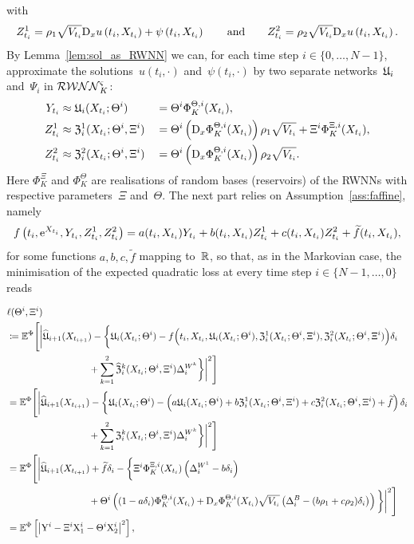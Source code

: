 with
$$
Z^1_{t_i}  = \rho_1 \sqrt{V_{t_{i}}} \mathrm{D}_{x} u\left({t_{i}}, X_{t_{i}}\right) + \psi\left({t_{i}}, X_{t_{i}}\right)
\qquad\text{and}\qquad
Z^2_{t_i}  = \rho_2\sqrt{V_{t_{i}}} \mathrm{D}_{x} u\left({t_{i}}, X_{t_{i}}\right).
$$
By Lemma~\ref{lem:sol_as_RWNN} we can, for each time step $i\in\{0, \dots, N-1\}$, approximate the solutions~$u(t_i,\cdot)$ and~$\psi(t_i,\cdot)$ by two separate networks~$\mathfrak{U}_i$ and~$\Psi_i$ in $\mathcal{RWNN}_K^{\varsigma}$: 
\begin{alignat*}{3}
    Y_{t_i} &\approx \mathfrak{U}_i(X_{t_i}; \Theta^i) && = \Theta^i \Phi^{\Theta,i}_K(X_{t_i}), \\
    Z^1_{t_i} &\approx \mathfrak{Z}^1_i(X_{t_i}; \Theta^i, \Xi^i) && = \Theta^i \left(\mathrm{D}_{x} \Phi_K^{\Theta,i}(X_{t_i})\right) \rho_1\sqrt{V_{t_i}} + \Xi^i\Phi^{\Xi,i}_K(X_{t_i}), \\
    Z^2_{t_i} &\approx \mathfrak{Z}^2_i(X_{t_i}; \Theta^i, \Xi^i) && = \Theta^i \left(\mathrm{D}_{x} \Phi_K^{\Theta,i}(X_{t_i})\right) \rho_2\sqrt{V_{t_i}}.
\end{alignat*}
Here $\Phi_K^\Xi$ and $\Phi_K^\Theta$ are realisations of random bases (reservoirs) of the RWNNs with respective parameters~$\Xi$ and~$\Theta$. 
The next part relies on Assumption~\ref{ass:faffine}, namely
$$
f\left(t_i, \mathrm{e}^{X_{t_{i}}},  Y_{t_i},  Z^1_{t_i},  Z^2_{t_i}\right) = a(t_i,X_{t_i}) Y_{t_i} + b(t_i,X_{t_i}) Z^1_{t_i} + c(t_i,X_{t_i}) Z^2_{t_i} + \widetilde{f}(t_i,X_{t_i}),
$$
for some functions $a,b,c,\widetilde{f}$ mapping to~$\mathbb{R}$, so that, as in the Markovian case, the minimisation of the expected quadratic loss at every time step $i\in\{N-1,\dots,0\}$ reads
\begin{small}
\begin{align*}
    &\ell(\Theta^i, \Xi^i) \\ &\defEqual \EE^\Phi\Bigg[\bigg|\widehat\Uf_{i+1}(X_{t_{i+1}})-\bigg\{\Uf_i(X_{t_i}; \Theta^i)-f\Big(t_{i}, X_{t_{i}}, \Uf_i(X_{t_i}; \Theta^i), \Zf^1_i(X_{t_i}; \Theta^i, \Xi^i), \Zf^2_i(X_{t_i}; \Theta^i, \Xi^i)\Big)\Deli \\
    & \hspace{3cm} + \sum_{k=1}^2\widehat \Zf^k_i(X_{t_i}; \Theta^i, \Xi^i)\Delta^{W^k}_{i}\bigg\}\bigg|^2\Bigg] \\
    &= \EE^\Phi\Bigg[\bigg|\widehat\Uf_{i+1}(X_{t_{i+1}})-\bigg\{\Uf_i(X_{t_i}; \Theta^i)-\left(a\Uf_i(X_{t_i}; \Theta^i) + b\Zf^1_i(X_{t_i}; \Theta^i, \Xi^i) + c\Zf^2_i(X_{t_i}; \Theta^i, \Xi^i) + \widetilde{f}\right)\Deli \\
    & \hspace{3cm} + \sum_{k=1}^2\Zf^k_i(X_{t_i}; \Theta^i, \Xi^i)\Delta^{W^k}_{i}\bigg\}\bigg|^2\Bigg] \\
    &= \EE^\Phi\Bigg[\bigg|\widehat\Uf_{i+1}(X_{t_{i+1}}) + \widetilde{f}\Deli  - \bigg\{ \Xi^i\Phi_K^{\Xi,i}(X_{t_i})\left(\Delta^{W^1}_{i}-b\Deli \right) \\
    & \hspace{3cm} + \Theta^i\left((1-a\Deli )\Phi_K^{\Theta,i}(X_{t_i}) + \Dx\Phi_K^{\Theta,i}(X_{t_i})\sqrt{V_{t_i}}\left(\Delta^{B}_{i} - (b\rho_1 + c\rho_2)\Deli \right) \right) \bigg\}\bigg|^2\Bigg] \\
    &= \EE^\Phi\left[\left|\Y^i - \Xi^i \X_1^i -
    \Theta^i\X_2^i \right|^2\right],
\end{align*}
\end{small}%
